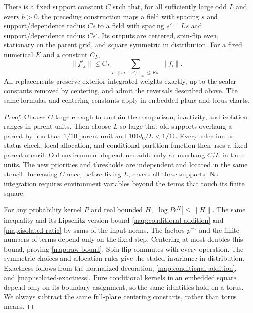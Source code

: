 \begin{proposition}\label{map:step}
There is a fixed support constant $C$ such that, for all sufficiently
large odd $L$ and every $b>0$, the preceding construction maps a field
with spacing $s$ and support/dependence radius $Cs$ to a field with
spacing $s'=Ls$ and support/dependence radius $Cs'$.  Its outputs are
centered, spin-flip even, stationary on the parent grid, and square
symmetric in distribution.  For a fixed numerical $K$ and a constant
$C_L$,
\begin{equation}\label{map:raw-bound}
 \|f'_j\|\le C_L\sum_{i:\,\|si-s'j\|_\infty\le Ks'}\|f_i\|.
\end{equation}
All replacements preserve exterior-integrated weights exactly, up to
the scalar constants removed by centering, and admit the reversals
described above.  The same formulas and centering constants apply in
embedded plane and torus charts.
\end{proposition}

\begin{proof}
Choose $C$ large enough to contain the comparison, inactivity, and
isolation ranges in parent units.  Then choose $L$ so large that old
supports overhang a parent by less than $1/10$ parent unit and
$100d_0/L<1/10$.  Every selection or status check, local allocation, and
conditional partition function then uses a fixed parent stencil.
Old environment dependence adds only an overhang $C/L$ in these units.
The new priorities and thresholds are independent and located in the
same stencil.  Increasing $C$ once, before fixing $L$, covers all these
supports.  No integration requires environment variables beyond the
terms that touch its finite square.

For any probability kernel $P$ and real bounded $H$,
$|\log Pe^H|\le\|H\|$.  The same inequality and its Lipschitz version
bound \eqref{map:conditional-addition} and
\eqref{map:isolated-ratio} by sums of the input norms.  The factors
$p^{-1}$ and the finite numbers of terms depend only on the fixed step.
Centering at most doubles this bound, proving \eqref{map:raw-bound}.
Spin flip commutes with every operation.  The symmetric choices and
allocation rules give the stated invariance in distribution.
Exactness follows from the normalized decoration,
\eqref{map:conditional-addition}, and
\eqref{map:isolated-exactness}.  Pure conditional kernels in an embedded
square depend only on its boundary assignment, so the same identities
hold on a torus.  We always subtract the same full-plane centering
constants, rather than torus means.
\end{proof}

